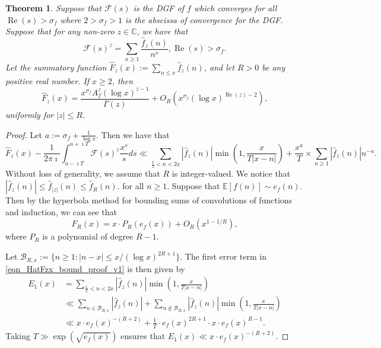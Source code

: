 \documentclass[11pt,reqno,a4letter]{article}
\numberwithin{figure}{section}
\numberwithin{table}{section}
\theoremstyle{plain}
\newtheorem{theorem}{Theorem}
\numberwithin{theorem}{section}
\theoremstyle{definition}
\renewcommand{\Re}{\operatorname{Re}}
\begin{document}
\begin{theorem}
Suppose that $\mathcal{F}(s)$ is the DGF of $f$ which converges for 
all $\Re(s) > \sigma_f$ where $2 > \sigma_f > 1$ is the abscissa of 
convergence for the DGF. 
Suppose that for any non-zero $z \in \mathbb{C}$, we have that 
\[
\mathcal{F}(s)^{z} = \sum_{n \geq 1} \frac{\widehat{f}_z(n)}{n^s}, 
     \Re(s) > \sigma_f. 
\]
Let the summatory function $\widehat{F}_z(x) := \sum_{n \leq x} \widehat{f}_z(n)$, and 
let $R > 0$ be any positive real number. If $x \geq 2$, then 
\[
     \widehat{F}_z(x) = \frac{x^{\sigma_f} A_f^z (\log x)^{z-1}}{\Gamma(z)} + 
     O_R\left(x^{\sigma_f} (\log x)^{\Re(z) - 2}\right), 
\]
uniformly for $|z| \leq R$. 
\end{theorem}
\begin{proof}
Let $a := \sigma_f + \frac{1}{\log x}$. Then we have that 
\begin{equation}
\label{eqn_HatFzx_bound_proof_v1}
\widehat{F}_z(x) - \frac{1}{2\pi\imath} \int_{a-\imath T}^{a+\imath T} 
     \mathcal{F}(s)^z \frac{x^s}{s} ds \ll 
     \sum_{\frac{x}{2} < n < 2x} |\widehat{f}_z(n)| \min\left(1, \frac{x}{T|x-n|}\right) + 
     \frac{x^a}{T} \times \sum_{n \geq 1} |\widehat{f}_z(n)| n^{-a}. 
\end{equation}
Without loss of generality, we assume that $R$ is integer-valued. 
We notice that $|\widehat{f}_z(n)| \leq \widehat{f}_{|z|}(n) \leq \widehat{f}_R(n)$. 
for all $n \geq 1$. Suppose that $\mathbb{E}[f(n)] \sim e_f(n)$. Then by the 
hyperbola method for bounding sums of convolutions of functions and 
induction, we can see that 
\[
\widehat{F}_R(x) = x \cdot P_R(e_f(x)) + O_R(x^{1-1/R}), 
\]
where $P_R$ is a polynomial of degree $R-1$. 

Let $\mathcal{B}_{R,x} := \{n \geq 1: |n-x| \leq x / (\log x)^{2R+1}\}$. 
The first error term in \eqref{eqn_HatFzx_bound_proof_v1} is then given by 
\begin{align*}
E_1(x) & = \sum_{\frac{x}{2} < n < 2x} |\widehat{f}_z(n)| \min\left(1, \frac{x}{T|x-n|}\right) \\ 
     & \ll \sum_{n \in \mathcal{B}_{R,x}} |\widehat{f}_z(n)| + 
     \sum_{n \notin \mathcal{B}_{R,x}} |\widehat{f}_z(n)| \min\left(1, \frac{x}{T|x-n|}\right) \\ 
     & \ll x \cdot e_f(x)^{-(R+2)} + \frac{1}{T} \cdot e_f(x)^{2R+1} \cdot x \cdot e_f(x)^{R-1}. 
\end{align*}
Taking $T \gg \exp(\sqrt{e_f(x)})$ ensures that $E_1(x) \ll x \cdot e_f(x)^{-(R+2)}$. 


\end{proof}
\end{document}
